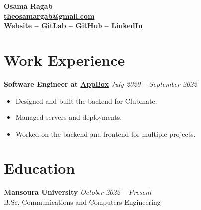 \documentclass[a4paper]{article}
\newcommand{\hr}{\vspace{10pt}\noindent\hrulefill}
\newcommand{\headerdate}[2]{\textbf{#1} \hfill \textit{\footnotesize{#2}}}
\begin{document}
\begin{center}
	\bfseries{\huge{Osama Ragab}}\\
	\vspace{2mm}
	\href{mailto:theosamargab@gmail.com}{\textbf{theosamargab@gmail.com}}\\
	\vspace{2mm}
	\href{https://osamaragab.gitlab.io}{\textbf{Website}} --
	\href{https://gitlab.com/osamaragab}{\textbf{GitLab}} --
	\href{https://github.com/osamamragab}{\textbf{GitHub}} --
	\href{https://www.linkedin.com/in/osamamragab}{\textbf{LinkedIn}}
\end{center}

\hr

\section{Work Experience}

\headerdate
	{Software Engineer at \href{https://www.app-box.co.uk}{AppBox}}
	{July 2020 -- September 2022}
\begin{itemize}
	\item Designed and built the backend for Clubmate.
	\item Managed servers and deployments.
	\item Worked on the backend and frontend for multiple projects.
\end{itemize}

\hr

\section{Education}

\headerdate{Mansoura University}{October 2022 -- Present}\\
\indent B.Sc. Communications and Computers Engineering
\end{document}

